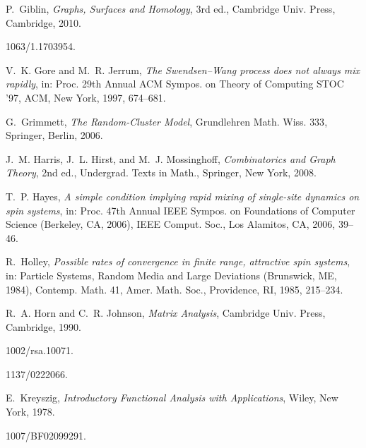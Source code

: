 \documentclass{dis}
\theoremstyle{citing}
\begin{document}
\begin{thebibliography}{10}
P.~Giblin,
{\em Graphs, Surfaces and Homology}, 3rd ed.,
Cambridge Univ. Press, Cambridge, 2010.

{\leavevmode{}1063/1.1703954}.

V.~K. Gore and M.~R. Jerrum,
{\em The {S}wendsen--{W}ang process does not always mix rapidly},
in: Proc. 29th Annual ACM Sympos. on Theory of
Computing STOC '97, ACM, New York, 1997, 674--681.

G.~Grimmett,
{\em The Random-Cluster Model}, 
Grundlehren Math. Wiss. {333}, Springer, Berlin, 2006.

J.~M. Harris, J.~L. Hirst, and M.~J. Mossinghoff,
{\em Combinatorics and Graph Theory}, 2nd ed.,
Undergrad. Texts in Math., Springer, New York, 2008.

T.~P. Hayes,
{\em A simple condition implying rapid mixing of single-site dynamics on
spin systems},
in: Proc. 47th Annual IEEE Sympos. on Foundations
of Computer Science (Berkeley, CA, 2006), IEEE Comput. Soc., Los Alamitos, CA, 2006, 39--46.

R.~Holley,
{\em Possible rates of convergence in finite range, attractive spin
systems},
in: Particle Systems, Random Media and Large Deviations
({B}runswick, ME, 1984),
Contemp. Math. {41}, Amer. Math. Soc., Providence, RI, 1985, 215--234. 

R.~A. Horn and C.~R. Johnson,
{\em Matrix Analysis},
Cambridge Univ. Press, Cambridge, 1990.

{\leavevmode{}1002/rsa.10071}.

{\leavevmode{}1137/0222066}.

E.~Kreyszig,
{\em Introductory Functional Analysis with Applications},
Wiley, New York, 1978.

{\leavevmode{}1007/BF02099291}.


\end{thebibliography}
\end{document}
